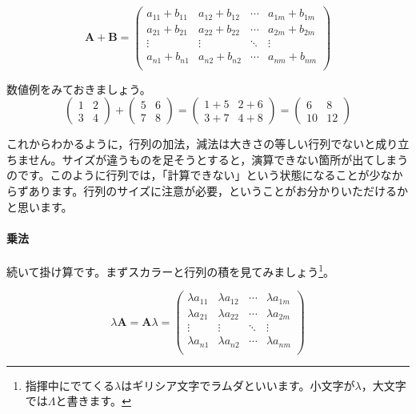 \documentclass{ltjsbook}
\begin{document}
\begin{equation*}
\bm{A}+\bm{B} =
\begin{pmatrix}
a_{11}+b_{11} & a_{12}+b_{12} & \cdots & a_{1m}+b_{1m} \\
a_{21}+b_{21} & a_{22}+b_{22} & \cdots & a_{2m}+b_{2m} \\
\vdots & \vdots & \ddots & \vdots \\
a_{n1}+b_{n1} & a_{n2}+b_{n2} & \cdots & a_{nm}+b_{nm} \\
\end{pmatrix}
\end{equation*}

数値例をみておきましょう。
\begin{equation*}
    \begin{pmatrix}
        1 & 2 \\
        3 & 4
        \end{pmatrix}
        +
        \begin{pmatrix}
        5 & 6 \\
        7 & 8
        \end{pmatrix}
        =
        \begin{pmatrix}
        1+5 & 2+6 \\
        3+7 & 4+8
        \end{pmatrix}
        =
        \begin{pmatrix}
        6 & 8 \\
        10 & 12
        \end{pmatrix}    
\end{equation*}

これからわかるように，行列の加法，減法は大きさの等しい行列でないと成り立ちません。サイズが違うものを足そうとすると，演算できない箇所が出てしまうのです。このように行列では，「計算できない」という状態になることが少なからずあります。行列のサイズに注意が必要，ということがお分かりいただけるかと思います。


\paragraph{乗法}
続いて掛け算です。まずスカラーと行列の積を見てみましょう\footnote{指揮中にでてくる$\lambda$はギリシア文字でラムダといいます。小文字が$\lambda$，大文字では$\Lambda$と書きます。}。

\begin{equation*}
    \lambda \bm{A} = \bm{A} \lambda =
    \begin{pmatrix}
    \lambda a_{11} & \lambda a_{12} & \cdots & \lambda a_{1m}\\
    \lambda a_{21} & \lambda a_{22} & \cdots & \lambda a_{2m}\\
    \vdots & \vdots & \ddots & \vdots \\
    \lambda a_{n1} & \lambda a_{n2} & \cdots & \lambda a_{nm}\\
    \end{pmatrix}
\end{equation*}
\end{document}
